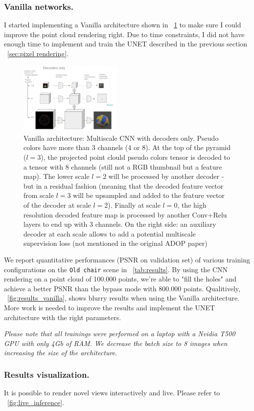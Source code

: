 \subsubsection{Vanilla networks.}
\label{sec:vanilla rendering}
I started implementing a Vanilla architecture shown in ~\cref{fig:decoders} to make sure I could improve the point cloud rendering right. Due to time constraints, I did not have enough time to implement and train the UNET described in the previous section ~\cref{sec:pixel rendering}.
\begin{figure}[htpb]
    \centering
    \includegraphics[width=0.45\textwidth]{figures/multiscale_decoders_only.png}
    \caption{Vanilla architecture: Multiscale CNN with decoders only. Pseudo colors have more than 3 channels (4 or 8). At the top of the pyramid ($l=3$), the projected point clould pseudo colors tensor is decoded to a tensor with 8 channels (still not a RGB thumbnail but a feature map). The lower scale $l=2$ will be processed by another decoder - but in a residual fashion (meaning that the decoded feature vector from scale $l=3$ will be upsampled and added to the feature vector of the decoder at scale $l=2$). Finally at scale $l=0$, the high resolution decoded feature map is processed by another Conv+Relu layers to end up with 3 channels. On the right side: an auxiliary decoder at each scale allows to add a potential multiscale supervision loss (not mentioned in the original ADOP paper)}
    \label{fig:decoders}
\end{figure}

We report quantitative performances (PSNR on validation set) of various training configurations on the \texttt{Old chair} scene in ~\cref{tab:results}. By using the CNN rendering on a point cloud of 100.000 points, we're able to "fill the holes" and achieve a better PSNR than the bypass mode with 800.000 points. Qualitively, ~\cref{fig:results_vanilla}, shows blurry results when using the Vanilla architecture. More work is needed to improve the results and implement the UNET architecture with the right parameters.

\textit{Please note that all trainings were performed on a laptop with a Nvidia T500 GPU with only 4Gb of RAM. We decrease the batch size to 8 images when increasing the size of the architecture}.

\subsubsection{Results visualization.}
It is possible to render novel views interactively and live. Please refer to ~\cref{fig:live_inference}.